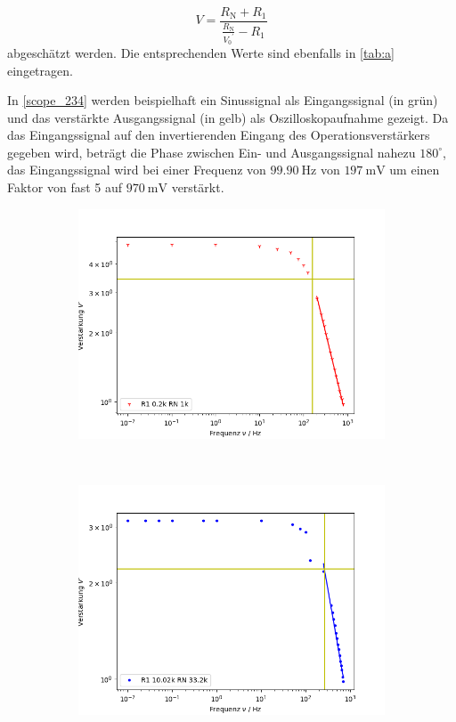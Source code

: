 \begin{equation}
	V = \frac{R_\text{N} + R_1}{\frac{R_\text{N}}{{V_0}^\prime} - R_1}
\end{equation}
abgeschätzt werden. Die entsprechenden Werte sind ebenfalls in \autoref{tab:a} eingetragen.\par
In \autoref{scope_234} werden beispielhaft ein Sinussignal als Eingangssignal (in grün) und das verstärkte Ausgangssignal (in gelb) als Oszilloskopaufnahme gezeigt. Da das Eingangssignal auf den invertierenden Eingang des Operationsverstärkers gegeben wird, beträgt die Phase zwischen Ein- und Ausgangssignal nahezu $180^\circ$, das Eingangssignal wird bei einer Frequenz von $\SI{99.90}{\hertz}$ von $\SI{197}{\milli\volt}$ um einen Faktor von fast 5 auf $\SI{970}{\milli\volt}$ verstärkt.
\begin{figure}[h]
	\centering
	\begin{subfigure}[t]{0.5\textwidth}
		\centering
		\includegraphics[width=\textwidth]{img/a_R1_0-2k_RN_1k.png}
	\end{subfigure}%
	~
	\begin{subfigure}[t]{0.5\textwidth}
		\centering
		\includegraphics[width=\textwidth]{img/a_R1_10-02k_RN_33-2k.png}

\end{subfigure}
\end{figure}
